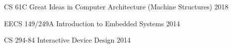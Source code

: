 
\begin{cvhonors}

  \cvhonor
  {CS 61C}
  {Great Ideas in Computer Architecture (Machine Structures)}
  {}
  {2018} %

  \cvhonor
  {EECS 149/249A}
  {Introduction to Embedded Systems}
  {}
  {2014} %

  \cvhonor
  {CS 294-84}
  {Interactive Device Design}
  {}
  {2014} %

\end{cvhonors}

